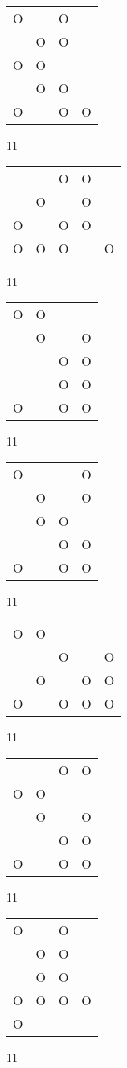 \begin{tabular}{|m{0.2cm}m{0.2cm}m{0.2cm}m{0.2cm}|}\hline
O& &O& \\
 &O&O& \\
O&O& & \\
 &O&O& \\
O& &O&O\\
\hline\end{tabular}11
\begin{tabular}{|m{0.2cm}m{0.2cm}m{0.2cm}m{0.2cm}m{0.2cm}|}\hline
 & &O&O& \\
 &O& &O& \\
O& &O&O& \\
O&O&O& &O\\
\hline\end{tabular}11
\begin{tabular}{|m{0.2cm}m{0.2cm}m{0.2cm}m{0.2cm}|}\hline
O&O& & \\
 &O& &O\\
 & &O&O\\
 & &O&O\\
O& &O&O\\
\hline\end{tabular}11
\begin{tabular}{|m{0.2cm}m{0.2cm}m{0.2cm}m{0.2cm}|}\hline
O& & &O\\
 &O& &O\\
 &O&O& \\
 & &O&O\\
O& &O&O\\
\hline\end{tabular}11
\begin{tabular}{|m{0.2cm}m{0.2cm}m{0.2cm}m{0.2cm}m{0.2cm}|}\hline
O&O& & & \\
 & &O& &O\\
 &O& &O&O\\
O& &O&O&O\\
\hline\end{tabular}11
\begin{tabular}{|m{0.2cm}m{0.2cm}m{0.2cm}m{0.2cm}|}\hline
 & &O&O\\
O&O& & \\
 &O& &O\\
 & &O&O\\
O& &O&O\\
\hline\end{tabular}11
\begin{tabular}{|m{0.2cm}m{0.2cm}m{0.2cm}m{0.2cm}|}\hline
O& &O& \\
 &O&O& \\
 &O&O& \\
O&O&O&O\\
O& & & \\
\hline\end{tabular}11
